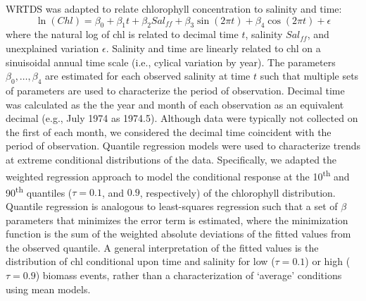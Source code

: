 \documentclass{svjour3}\usepackage[]{graphicx}\usepackage[]{color}
\begin{document}
\ac{WRTDS} was adapted to relate chlorophyll concentration to salinity and time:
\begin{equation}\label{eqn:funform}
\ln\left(Chl\right) = \beta_0 + \beta_1 t + \beta_2 Sal_{ff} + \beta_3 \sin\left(2\pi t\right) + \beta_4 \cos\left(2\pi t\right) + \epsilon
\end{equation}
\noindent where the natural log of \ac{chl} is related to decimal time $t$, salinity $Sal_{ff}$, and unexplained variation $\epsilon$.  Salinity and time are linearly related to \ac{chl} on a sinuisoidal annual time scale (i.e., cylical variation by year). The parameters $\beta_0,\ldots,\beta_4$ are estimated for each observed salinity at time $t$ such that multiple sets of parameters are used to characterize the period of observation.  Decimal time was calculated as the the year and month of each observation as an equivalent decimal (e.g., July 1974 as 1974.5).  Although data were typically not collected on the first of each month, we considered the decimal time coincident with the period of observation.  Quantile regression models \cite{Cade03} were used to characterize trends at extreme conditional distributions of the data.  Specifically, we adapted the weighted regression approach to model the conditional response at the 10\textsuperscript{th} and 90\textsuperscript{th} quantiles ($\tau=0.1$, and $0.9$, respectively) of the chlorophyll distribution. Quantile regression is analogous to least-squares regression such that a set of $\beta$ parameters that minimizes the error term is estimated, where the minimization function is the sum of the weighted absolute deviations of the fitted values from the observed quantile.  A general interpretation of the fitted values is the distribution of \ac{chl} conditional upon time and salinity for low ($\tau=0.1$) or high ($\tau=0.9$) biomass events, rather than a characterization of `average' conditions using mean models.
\end{document}
